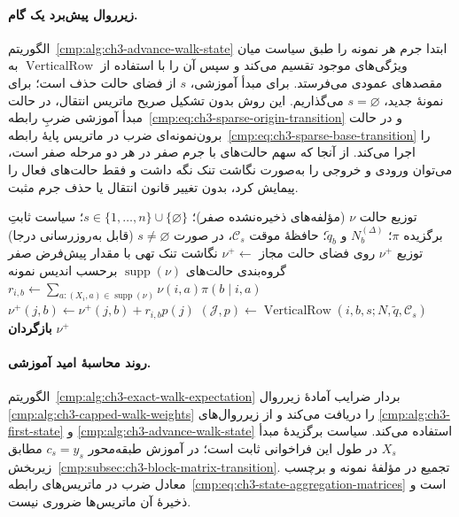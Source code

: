 \paragraph{زیرروال پیش‌برد یک گام.}
الگوریتم~\ref{cmp:alg:ch3-advance-walk-state}
ابتدا جرم هر نمونه را طبق سیاست
میان ویژگی‌های موجود تقسیم می‌کند
و سپس آن را با استفاده از
$\operatorname{VerticalRow}$ به
مقصدهای عمودی می‌فرستد. برای
مبدأ آموزشی، $s$ از فضای
حالت حذف است؛ برای نمونهٔ جدید،
$s=\varnothing$ می‌گذاریم.
این روش بدون تشکیل صریح
ماتریس انتقال، در حالت مبدأ آموزشی
ضربِ رابطه~\eqref{cmp:eq:ch3-sparse-origin-transition}
و در حالت برون‌نمونه‌ای
ضرب در ماتریس پایهٔ
رابطه~\eqref{cmp:eq:ch3-sparse-base-transition}
را اجرا می‌کند. از آنجا که سهم حالت‌های
با جرم صفر در هر دو مرحله صفر است، می‌توان
ورودی و خروجی را به‌صورت نگاشت تنک نگه داشت
و فقط حالت‌های فعال را پیمایش کرد، بدون
تغییر قانون انتقال یا حذف جرم مثبت.
\begin{algorithm}[!htbp]
\caption{زیرروال $\operatorname{Advance}$: انتشار یک گام کامل}
\label{cmp:alg:ch3-advance-walk-state}
\begin{algorithmic}[1]
\REQUIRE توزیع حالت $\nu$ (مؤلفه‌های ذخیره‌نشده صفر)؛
$s\in\{1,\ldots,n\}\cup\{\varnothing\}$؛
سیاست ثابتِ برگزیده $\pi$؛
$N_b^{(\Delta)}$ و $\widetilde q_b$؛
حافظهٔ موقت $\mathcal C_s$، در صورت $s\ne\varnothing$
(قابل به‌روزرسانی درجا)
\ENSURE توزیع $\nu^+$ روی فضای حالت مجاز
\STATE $\nu^+\gets$ نگاشت تنک تهی با مقدار پیش‌فرض صفر
\STATE گروه‌بندی حالت‌های $\operatorname{supp}(\nu)$ برحسب اندیس نمونه
        \STATE $r_{i,b}\gets
        \sum_{a:(X_i,a)\in\operatorname{supp}(\nu)}
        \nu(i,a)\pi(b\mid i,a)$
            \STATE $(\mathcal J,p)\gets
            \operatorname{VerticalRow}(i,b,s;N,\widetilde q,\mathcal C_s)$
                \STATE $\nu^+(j,b)\gets
                \nu^+(j,b)+r_{i,b}p(j)$
            \ENDFOR
        \ENDIF
    \ENDFOR
\ENDFOR
\STATE \textbf{بازگردان} $\nu^+$
\end{algorithmic}
\end{algorithm}

\paragraph{روند محاسبهٔ امید آموزشی.}
الگوریتم~\ref{cmp:alg:ch3-exact-walk-expectation}
بردار ضرایب آمادهٔ زیرروال
\ref{cmp:alg:ch3-capped-walk-weights} را دریافت می‌کند
و از زیرروال‌های
\ref{cmp:alg:ch3-first-state} و
\ref{cmp:alg:ch3-advance-walk-state}
استفاده می‌کند. سیاست برگزیدهٔ
مبدأ $X_s$ در طول این فراخوانی
ثابت است؛ در آموزش طبقه‌محور
$c_s=y_s$ مطابق
زیربخش~\ref{cmp:subsec:ch3-block-matrix-transition}.
تجمیع در مؤلفهٔ نمونه و
برچسب معادل ضرب در ماتریس‌های
رابطه~\eqref{cmp:eq:ch3-state-aggregation-matrices}
است و ذخیرهٔ آن ماتریس‌ها
ضروری نیست.

